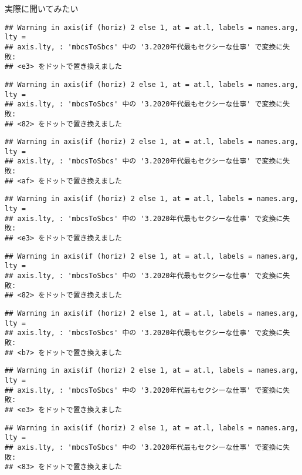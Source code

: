 \documentclass[ignorenonframetext,]{beamer}
\begin{document}
\begin{frame}[fragile]{実際に聞いてみたい}
\begin{verbatim}
## Warning in axis(if (horiz) 2 else 1, at = at.l, labels = names.arg, lty =
## axis.lty, : 'mbcsToSbcs' 中の '3.2020年代最もセクシーな仕事' で変換に失敗:
## <e3> をドットで置き換えました
\end{verbatim}

\begin{verbatim}
## Warning in axis(if (horiz) 2 else 1, at = at.l, labels = names.arg, lty =
## axis.lty, : 'mbcsToSbcs' 中の '3.2020年代最もセクシーな仕事' で変換に失敗:
## <82> をドットで置き換えました
\end{verbatim}

\begin{verbatim}
## Warning in axis(if (horiz) 2 else 1, at = at.l, labels = names.arg, lty =
## axis.lty, : 'mbcsToSbcs' 中の '3.2020年代最もセクシーな仕事' で変換に失敗:
## <af> をドットで置き換えました
\end{verbatim}

\begin{verbatim}
## Warning in axis(if (horiz) 2 else 1, at = at.l, labels = names.arg, lty =
## axis.lty, : 'mbcsToSbcs' 中の '3.2020年代最もセクシーな仕事' で変換に失敗:
## <e3> をドットで置き換えました
\end{verbatim}

\begin{verbatim}
## Warning in axis(if (horiz) 2 else 1, at = at.l, labels = names.arg, lty =
## axis.lty, : 'mbcsToSbcs' 中の '3.2020年代最もセクシーな仕事' で変換に失敗:
## <82> をドットで置き換えました
\end{verbatim}

\begin{verbatim}
## Warning in axis(if (horiz) 2 else 1, at = at.l, labels = names.arg, lty =
## axis.lty, : 'mbcsToSbcs' 中の '3.2020年代最もセクシーな仕事' で変換に失敗:
## <b7> をドットで置き換えました
\end{verbatim}

\begin{verbatim}
## Warning in axis(if (horiz) 2 else 1, at = at.l, labels = names.arg, lty =
## axis.lty, : 'mbcsToSbcs' 中の '3.2020年代最もセクシーな仕事' で変換に失敗:
## <e3> をドットで置き換えました
\end{verbatim}

\begin{verbatim}
## Warning in axis(if (horiz) 2 else 1, at = at.l, labels = names.arg, lty =
## axis.lty, : 'mbcsToSbcs' 中の '3.2020年代最もセクシーな仕事' で変換に失敗:
## <83> をドットで置き換えました
\end{verbatim}


\end{frame}
\end{document}
